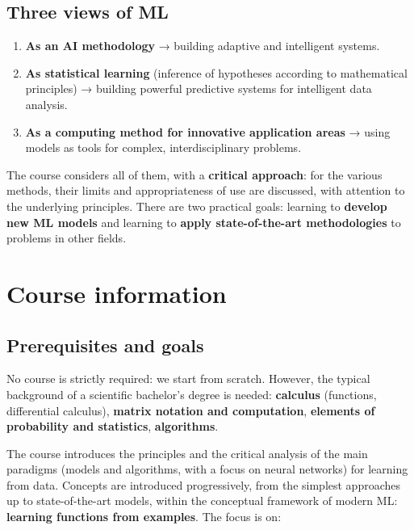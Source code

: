 \subsection{Three views of ML}\label{tre-punti-di-vista-sul-ml}

\begin{enumerate}
\def\labelenumi{\arabic{enumi}.}
\tightlist
\item
  \textbf{As an AI methodology} → building adaptive and intelligent
  systems.
\item
  \textbf{As statistical learning} (inference of hypotheses according
  to mathematical principles) → building powerful predictive systems
  for intelligent data analysis.
\item
  \textbf{As a computing method for innovative application areas} →
  using models as tools for complex, interdisciplinary problems.
\end{enumerate}

The course considers all of them, with a \textbf{critical approach}:
for the various methods, their limits and appropriateness of use are
discussed, with attention to the underlying principles. There are two
practical goals: learning to \textbf{develop new ML models} and
learning to \textbf{apply state-of-the-art methodologies} to problems
in other fields.

\section{Course information}\label{informazioni-sul-corso}

\subsection{Prerequisites and goals}\label{prerequisiti-e-obiettivi}

No course is strictly required: we start from scratch. However, the
typical background of a scientific bachelor's degree is needed:
\textbf{calculus} (functions, differential calculus), \textbf{matrix
notation and computation}, \textbf{elements of probability and
statistics}, \textbf{algorithms}.

The course introduces the principles and the critical analysis of the
main paradigms (models and algorithms, with a focus on neural networks)
for learning from data. Concepts are introduced progressively, from the
simplest approaches up to state-of-the-art models, within the
conceptual framework of modern ML: \textbf{learning functions from
examples}. The focus is on:

